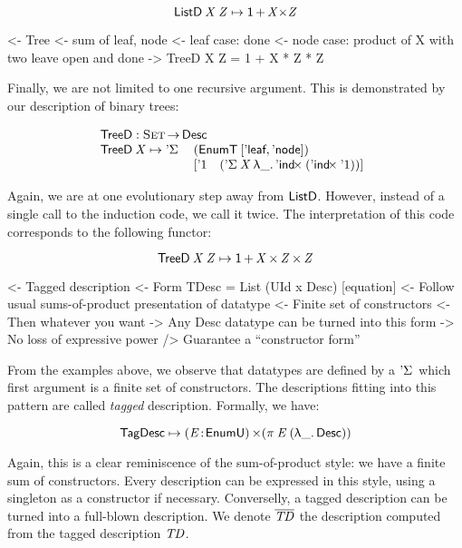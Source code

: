 \[    \ListD\: \V{X}\: \V{Z} \mapsto \Unit \mathop{\D{+}} \V{X} \D{\ensuremath{\times}} \V{Z}     \]

\begin{wstructure}
<- Tree
    <- sum of leaf, node
    <- leaf case: done
    <- node case: product of X with two leave open and done
    -> TreeD X Z = 1 + X * Z * Z
\end{wstructure}

Finally, we are not limited to one recursive argument. This is
demonstrated by our description of binary trees:

\[\stk{
\TreeD : \Set \To \Desc \\
\begin{array}{@{}ll}
\TreeD \: \V{X} \mapsto \DSigma{ & (\EnumT{[ \TreeLeaf, \TreeNode ]}) \\}
                           { & [ \DUnit \quad (\DSigma{\V{X}}{\LAM{\_} \DIndx{(\DIndx{\DUnit})}}) ]}
\end{array}
}\]

Again, we are at one evolutionary step away from $\ListD$. However,
instead of a single call to the induction code, we call it twice. The
interpretation of this code corresponds to the following functor:

\[    \TreeD\: \V{X}\: \V{Z} \mapsto \Unit \mathop{\D{+}} \V{X} \Prod \V{Z} \Prod \V{Z}     \]


\begin{wstructure}
<- Tagged description
    <- Form TDesc = List (UId x Desc) [equation]
    <- Follow usual sums-of-product presentation of datatype
        <- Finite set of constructors
        <- Then whatever you want
    -> Any Desc datatype can be turned into this form
        -> No loss of expressive power
        /> Guarantee a ``constructor form''
\end{wstructure}

From the examples above, we observe that datatypes are defined by a
$\DSigma{\!}{\!}$ which first argument is a finite set of
constructors. The descriptions fitting into this pattern are called
\emph{tagged} description. Formally, we have:

\[
 \TagDesc \mapsto \SIGMA{\V{E}}{\EnumU} (\spi{\V{E}}{(\LAM{\_} \Desc)})
\]

Again, this is a clear reminiscence of the sum-of-product style: we
have a finite sum of constructors. Every description can be expressed
in this style, using a singleton as a constructor if
necessary. Converselly, a tagged description can be turned into a
full-blown description. We denote $\toDesc{\V{TD}}$ the description
computed from the tagged description $\V{TD}$.

